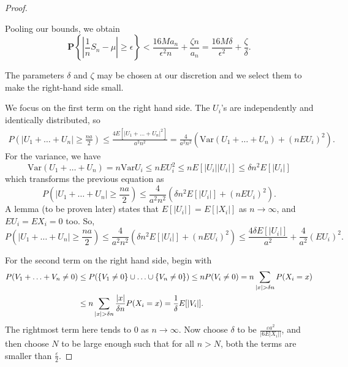 \documentclass[15pt,a4paper]{book}
\theoremstyle{definition}
\newcommand{\abs}[1]{\left| #1 \right|} %
\begin{document}
\begin{proof}
\begin{tcolorbox}[title=Analysis on $a_n$...,colback=blue!2!white,colframe=blue!55!black]
 Pooling our bounds, we obtain
$$
\mathbf{P}\left\{\left|\frac{1}{n} S_{n}-\mu\right| \geq \epsilon\right\}<\frac{16 M a_{n}}{\epsilon^{2} n}+\frac{\zeta n}{a_{n}}=\frac{16 M\delta}{\epsilon^{2}}+\frac{\zeta}{\delta} .
$$

The parameters $\delta$ and $\zeta$ may be chosen at our discretion and we select them to make the right-hand side small.
        \end{tcolorbox}
        \vspace{1em}
    We focus on the first term on the right hand side. The $U_{i}$'s are independently and identically distributed, so
    \begin{align}
        P\left(\abs{U_{1} + \ldots + U_{n}} \geq \frac{na}{2}\right) \leq \frac{4E[\abs{U_{1}+\ldots+U_{n}}^{2}]}{a^{2}n^{2}} = \frac{4}{a^{2}n^{2}} \left( \text{Var}(U_{1} + \ldots + U_{n}) + (nEU_{i})^{2} \right).
    \end{align}
    For the variance, we have
    \begin{equation}
        \text{Var}(U_{1}+\ldots+U_{n}) = n \text{Var}U_{i} \leq n EU_{i}^{2} \leq n E[\abs{U_{i}}\abs{U_{i}}] \leq \delta n^{2} E[\abs{U_{i}}]
    \end{equation}
    which transforms the previous equation as
    \begin{equation}
        P\left(\abs{U_{1} + \ldots + U_{n}} \geq \frac{na}{2}\right) \leq \frac{4}{a^{2}n^{2}} \left( \delta n^{2} E[\abs{U_{i}}] + (nEU_{i})^{2} \right).
    \end{equation}
    A lemma (to be proven later) states that $E[\abs{U_{i}}] = E[\abs{X_{i}}]$ as $n \to \infty$, and $EU_{i} = EX_{i} = 0$ too. So,
    \begin{equation}
        P\left(\abs{U_{1} + \ldots + U_{n}} \geq \frac{na}{2}\right) \leq \frac{4}{a^{2}n^{2}} \left( \delta n^{2} E[\abs{U_{i}}] + (nEU_{i})^{2} \right) \leq \frac{4 \delta E[\abs{U_{i}}]}{a^{2}} + \frac{4}{a^{2}} (EU_{i})^{2}.
    \end{equation}

    For the second term on the right hand side, begin with
    \begin{align}
        P(V_{1}+ \ldots + V_{n} \neq 0) &\leq P(\{V_{1} \neq 0\} \cup \ldots \cup \{V_{n} \neq 0\}) \leq nP(V_{i} \neq 0) = n \sum_{\abs{x} > \delta n} P(X_{i} = x) \notag \\
        &\leq n \sum_{\abs{x} > \delta n} \frac{\abs{x}}{\delta n} P(X_{i} = x) = \frac{1}{\delta} E[\abs{V_{i}}]. 
    \end{align}
    The rightmost term here tends to 0 as $n \to \infty$. Now choose $\delta$ to be $\frac{\varepsilon a^{2}}{\abs{6 E{\abs{X_{i}}}}}$, and then choose $N$ to be large enough such that for all $n > N$, both the terms are smaller than $\frac{\varepsilon}{2}$.
\end{proof}
\vspace{1em}
\end{document}
